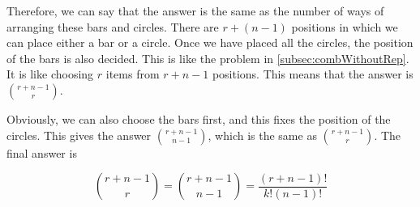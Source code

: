\documentclass[a4paper,12pt]{article}
\begin{document}
Therefore, we can say that the answer is the same as the number of ways of arranging these bars and circles. There are $r+(n-1)$ positions in which we can place either a bar or a circle. Once we have placed all the circles, the position of the bars is also decided. This is like the problem in \cref{subsec:combWithoutRep}. It is like choosing $r$ items from $r+n-1$ positions. This means that the answer is $\binom{r+n-1}{r}$.

Obviously, we can also choose the bars first, and this fixes the position of the circles. This gives the answer $\binom{r+n-1}{n-1}$, which is the same as $\binom{r+n-1}{r}$. The final answer is

\begin{equation}
  \binom{r+n-1}{r} = \binom{r+n-1}{n-1} = \frac{(r+n-1)!}{k!(n-1)!}
\end{equation}
\end{document}
